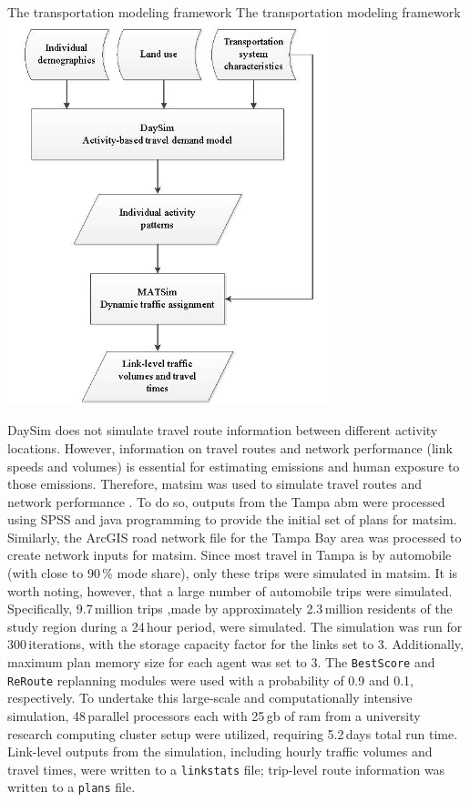 \createfigure%
{The transportation modeling framework}%
{The transportation modeling framework}%
{\label{fig:tampa-fig2}}%
{\includegraphics[width=0.7\textwidth, angle=0]{./scenarios/figures/tampa-fig2.jpg}}%
{}

DaySim does not simulate travel route information between different activity locations. 
However, information on travel routes and network performance (\ie link speeds and volumes) is essential for estimating emissions and human exposure to those emissions. 
Therefore, \gls{matsim} was used to simulate travel routes and network performance %
\citep[][]{BalmerEtAl2008ITMStructurePerformance}.
To do so, outputs from the Tampa \gls{abm} were processed using SPSS and \gls{java} programming to provide the initial set of plans for \gls{matsim}. 
Similarly, the ArcGIS road network file for the Tampa Bay area was processed to create network inputs for \gls{matsim}. 
Since most travel in Tampa is by automobile (with close to 90\,\% mode share), only these trips were simulated in \gls{matsim}. 
It is worth noting, however, that a large number of automobile trips were simulated. 
Specifically, 9.7\,million trips ,made by approximately 2.3\,million residents of the study region during a 24\,hour period, were simulated. 
The simulation was run for 300\,iterations, with the storage capacity factor for the links set to 3. 
Additionally, maximum plan memory size for each agent was set to 3. The \lstinline|BestScore| and \lstinline|ReRoute| replanning modules were used with a probability of 0.9 and 0.1, respectively. 
To undertake this large-scale and computationally intensive simulation, 48\,parallel processors each with 25\,\gls{gb} of \gls{ram} from a university research computing cluster setup were utilized, requiring 5.2\,days total run time. 
Link-level outputs from the simulation, including hourly traffic volumes and travel times, were written to a \lstinline|linkstats| file;  trip-level route information was written to a \lstinline|plans| file.

